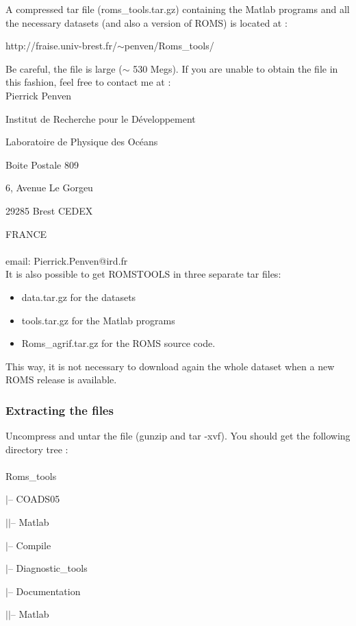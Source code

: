 A compressed tar file (roms\_tools.tar.gz) containing the 
Matlab programs and all the necessary
datasets (and also a version of ROMS) is located at :
\begin{center}
http://fraise.univ-brest.fr/$\sim$penven/Roms\_tools/ 
\end{center}
Be careful, the file is large ($\sim$ 530 Megs).
If you are unable to obtain the file in this fashion, feel 
free to contact me at : \\ 

Pierrick Penven

Institut de Recherche pour le D\'eveloppement

Laboratoire de Physique des Oc\'eans

Boite Postale 809

6, Avenue Le Gorgeu

29285 Brest CEDEX

FRANCE \\
\\
email: Pierrick.Penven@ird.fr
\\

\noindent It is also possible to get ROMSTOOLS in three separate tar files:
\begin{itemize}
\item data.tar.gz for the datasets
\item tools.tar.gz for the Matlab programs
\item Roms\_agrif.tar.gz for the ROMS source code.
\end{itemize}
This way, it is not necessary to download again the whole dataset when a new ROMS
release is available.

\subsubsection{Extracting the files}

Uncompress and untar the file (gunzip and tar -xvf). You should get the 
following directory tree : \\
\\
Roms\_tools

$|$-- COADS05 

$|$\hspace{0.5cm}$|$-- Matlab

$|$-- Compile

$|$-- Diagnostic\_tools

$|$-- Documentation

$|$\hspace{0.5cm}$|$-- Matlab

